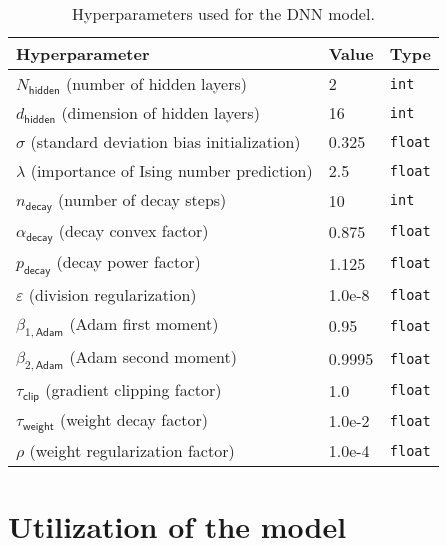 \documentclass{psu-report}
\begin{document}
\begin{table}[htbp]
    \centering
    \begin{tabular}{lll}
        \hline
        \textbf{Hyperparameter} & \textbf{Value} & \textbf{Type} \\
        \hline
        \(N_\mathsf{hidden}\) (number of hidden layers) &
        2 & \texttt{int} \\
        \(d_\mathsf{hidden}\) (dimension of hidden layers) &
        16 & \texttt{int} \\
        \(\sigma\) (standard deviation bias initialization) &
        0.325 & \texttt{float} \\
        \(\lambda\) (importance of Ising number prediction) &
        2.5 & \texttt{float} \\
        \(n_\mathsf{decay}\) (number of decay steps) &
        10 & \texttt{int} \\
        \(\alpha_\mathsf{decay}\) (decay convex factor) &
        0.875 & \texttt{float} \\
        \(p_\mathsf{decay}\) (decay power factor) &
        1.125 & \texttt{float} \\
        \(\varepsilon\) (division regularization) &
        1.0e-8 & \texttt{float} \\
        \(\beta_{1,\mathsf{Adam}}\) (Adam first moment) &
        0.95 & \texttt{float} \\
        \(\beta_{2,\mathsf{Adam}}\) (Adam second moment) &
        0.9995 & \texttt{float} \\
        \(\tau_\mathsf{clip}\) (gradient clipping factor) &
        1.0 & \texttt{float} \\
        \(\tau_\mathsf{weight}\) (weight decay factor) &
        1.0e-2 & \texttt{float} \\
        \(\rho\) (weight regularization factor) &
        1.0e-4 & \texttt{float} \\
        \hline
    \end{tabular}
    \caption{Hyperparameters used for the DNN model.}
    \label{tab:dnn_hyperparameters}
\end{table}

\section{Utilization of the model}
\end{document}
